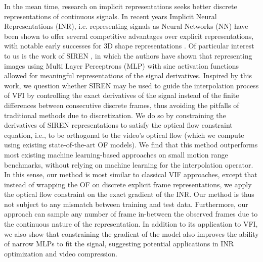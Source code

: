 \documentclass{article}
\begin{document}
In the mean time, research on implicit representations seeks better discrete representations of continuous signals.
In recent years Implicit Neural Representations (INR), i.e. representing signals as Neural Networks (NN)
have been shown to offer several competitive advantages over explicit representations,
with notable early successes for 3D shape representations \cite{mildenhall2020nerf}.
Of particular interest to us is the work of SIREN \cite{sitzmann2020implicit},
in which the authors have shown that representing images using Multi Layer Perceptrons (MLP) with sine activation functions
allowed for meaningful representations of the signal derivatives.
Inspired by this work, we question whether SIREN may be used to guide the interpolation
process of VFI by controlling the exact derivatives of the signal instead of the finite differences
between consecutive discrete frames, thus avoiding the pitfalls of traditional methods due to discretization.
We do so by constraining the derivatives of SIREN representations to satisfy the optical flow constraint equation,
i.e., to be orthogonal to the video's optical flow
(which we compute using existing state-of-the-art OF models).
We find that this method outperforms most existing
machine learning-based approaches on small motion range benchmarks,
without relying on machine learning for the interpolation operator.
In this sense, our method is most similar to classical VIF approaches,
except that instead of wrapping the OF on discrete explicit frame representations,
we apply the optical flow constraint on the exact gradient of the INR.
Our method is thus not subject to any mismatch between training and test data.
Furthermore, our approach can sample any number of frame in-between the observed frames
due to the continuous nature of the representation.
In addition to its application to VFI, we also show that constraining the gradient
of the model also improves the ability of narrow MLPs to fit the signal,
suggesting potential applications in INR optimization and video compression.
\end{document}
